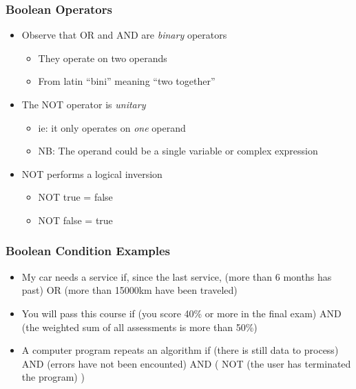 \documentclass[14pt]{beamer}
\begin{document}
\begin{frame} %
\frametitle{Boolean Operators}
\begin{itemize}
\item Observe that OR and AND are \textit{binary} operators
	\begin{itemize}
		\item They operate on two operands
		\item From latin ``bini'' meaning ``two together''
	\end{itemize}
\item The NOT operator is \textit{unitary}
	\begin{itemize}
		\item ie: it only operates on \textit{one} operand
		\item NB: The operand could be a single variable or complex expression
	\end{itemize}
\item NOT performs a logical inversion
	\begin{itemize}
		\item NOT true = false
		\item NOT false = true
	\end{itemize}
\end{itemize}
\end{frame}

\begin{frame} %
\frametitle{Boolean Condition Examples}

\begin{itemize}
	\item My car needs a service if, since the last service, (more than 6 months has past) OR (more than 15000km have been traveled)
	\item You will pass this course if (you score 40\% or more in the final exam) AND (the weighted sum of all assessments is more than 50\%)
	\item A computer program repeats an algorithm if (there is still data to process) AND (errors have not been encounted) AND ( NOT (the user has terminated the program) )
\end{itemize}
\end{frame}
\end{document}
